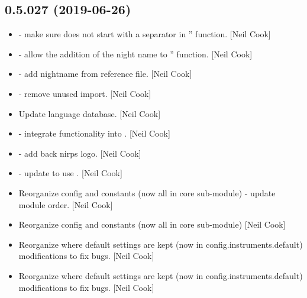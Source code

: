 \documentclass[a4paper,10pt,english]{report}
\begin{document}
\subsection{0.5.027 (2019-06-26)}
\label{\detokenize{misc/changelog:id110}}\begin{itemize}
\item {} 
 - make sure  does not start with a separator in
” function. {[}Neil Cook{]}

\item {} 
 - allow the addition of the night name to ”
function. {[}Neil Cook{]}

\item {} 
 - add nightname from reference file. {[}Neil
Cook{]}

\item {} 
 - remove unused import. {[}Neil Cook{]}

\item {} 
Update language database. {[}Neil Cook{]}

\item {} 
 - integrate  functionality into .
{[}Neil Cook{]}

\item {} 
 - add back nirps logo. {[}Neil Cook{]}

\item {} 
 - update  to use . {[}Neil
Cook{]}

\item {} 
Reorganize config and constants (now all in core sub-module) - update
module order. {[}Neil Cook{]}

\item {} 
Reorganize config and constants (now all in core sub-module) {[}Neil
Cook{]}

\item {} 
Reorganize where default settings are kept (now in
config.instruments.default) \textendash{} modifications to fix bugs. {[}Neil Cook{]}

\item {} 
Reorganize where default settings are kept (now in
config.instruments.default) \textendash{} modifications to fix bugs. {[}Neil Cook{]}


\end{itemize}
\end{document}
